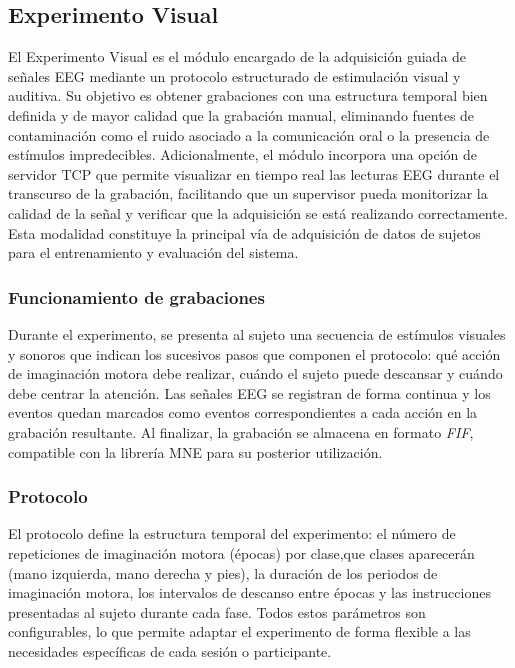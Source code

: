 \subsection{Experimento Visual}
\label{subsec:experimentoVisual}

El Experimento Visual es el módulo encargado de la adquisición guiada de señales EEG mediante un protocolo estructurado de estimulación visual y auditiva. Su objetivo es obtener grabaciones con una estructura temporal bien definida y de mayor calidad que la grabación manual, eliminando fuentes de contaminación como el ruido asociado a la comunicación oral o la presencia de estímulos impredecibles. Adicionalmente, el módulo incorpora una opción de servidor TCP que permite visualizar en tiempo real las lecturas EEG durante el transcurso de la grabación, facilitando que un supervisor pueda monitorizar la calidad de la señal y verificar que la adquisición se está realizando correctamente. Esta modalidad constituye la principal vía de adquisición de datos de sujetos para el entrenamiento y evaluación del sistema.

\subsubsection{Funcionamiento de grabaciones}
\label{subsubsec:funcionamientoGrabaciones}

Durante el experimento, se presenta al sujeto una secuencia de estímulos visuales y sonoros que indican los sucesivos pasos que componen el protocolo: qué acción de imaginación motora debe realizar, cuándo el sujeto puede descansar y cuándo debe centrar la atención. Las señales EEG se registran de forma continua y los eventos quedan marcados como eventos correspondientes a cada acción en la grabación resultante. Al finalizar, la grabación se almacena en formato \textit{FIF}, compatible con la librería MNE para su posterior utilización.

\subsubsection{Protocolo}
\label{subsubsec:protocoloExperimento}

El protocolo define la estructura temporal del experimento: el número de repeticiones de imaginación motora (épocas) por clase,que clases aparecerán (mano izquierda, mano derecha y pies), la duración de los periodos de imaginación motora, los intervalos de descanso entre épocas y las instrucciones presentadas al sujeto durante cada fase. Todos estos parámetros son configurables, lo que permite adaptar el experimento de forma flexible a las necesidades específicas de cada sesión o participante.

